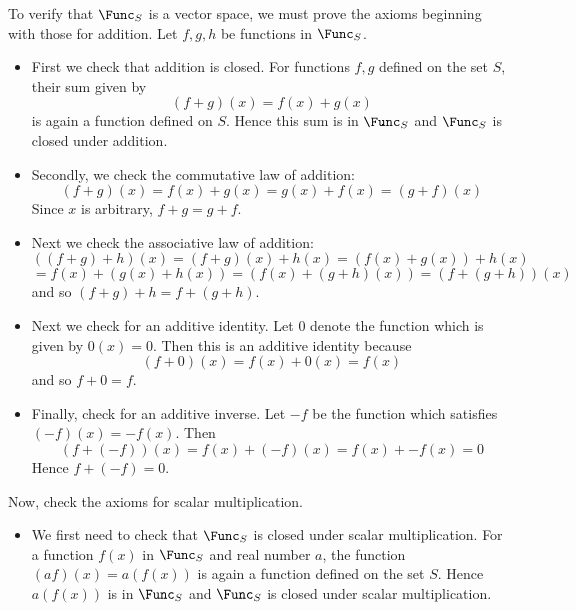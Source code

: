 \begin{solution}
To verify that $\Func_S$ is a vector space, we must prove the axioms beginning with those for addition. Let $f, g, h$ be functions in $\Func_S$. 

\begin{itemize}
\item
First we check that addition is closed.  For functions $f, g$ defined on the set $S$, their sum given by 
\[
(f+g)(x) = f(x)+g(x)
\]
is again a function defined on $S$. Hence this sum is in $\Func_S$ and $\Func_S$ is closed under addition. 

\item
Secondly, we check the commutative law of addition:
\begin{equation*}
(f+g) (x) =f(x) +g(x)
=g(x) +f(x) =(g+f) (x)
\end{equation*}
Since $x$ is arbitrary, $f+g=g+f$.

\item
Next we check the associative law of addition:
\begin{equation*}
((f+g) +h) (x) = (f+g)
(x) +h(x) =(f(x) +g(x)
) +h(x)
\end{equation*}
\begin{equation*}
=f(x) +(g(x) +h(x)) =(
f(x) +(g+h) (x)) =(f+(
g+h)) (x)
\end{equation*}
and so $(f+g) +h=f+(g+h)$.

\item
Next we check for an additive identity.  Let $0$ denote the
function which is given by $0(x) =0$. Then this is an additive
identity because 
\begin{equation*}
(f+0) (x) =f(x) +0(x)
=f(x)
\end{equation*}
and so $f+0=f$. 

\item
Finally, check for an additive inverse. Let $-f$ be the function which satisfies $(-f)
(x) = -f(x)$. Then 
\begin{equation*}
(f+(-f)) (x) = f(x)
+(-f) (x) = f(x) +-f(x)
=0
\end{equation*}
Hence $f+(-f) =0$. 
\end{itemize}

Now, check the axioms for scalar multiplication.
\begin{itemize}
\item
We first need to check that $\Func_S$ is closed under scalar multiplication. 
For a function $f(x)$ in $\Func_S$ and real number $a$, the function $(af)(x) = a(f(x))$ is again a function defined on the set $S$. Hence $a(f(x))$ is in $\Func_S$ and $\Func_S$ is closed under scalar multiplication. 


\end{itemize}
\end{solution}
